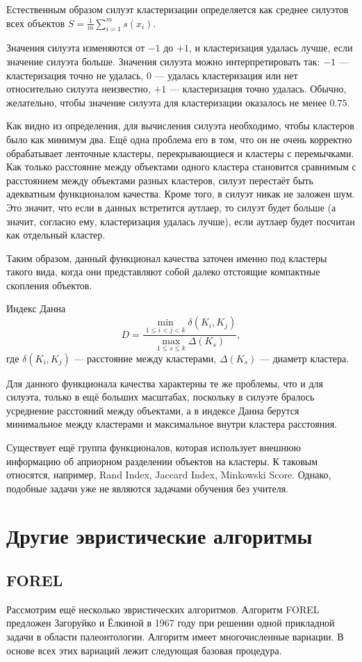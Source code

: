 \documentclass[10pt]{article}
\renewcommand{\leq}{\leqslant}
\begin{document}
Естественным образом силуэт кластеризации определяется как среднее силуэтов всех объектов $S = \frac{1}{m} \sum_{i=1}^m s(x_i)$.

Значения силуэта изменяются от $-1$ до $+1$, и кластеризация удалась лучше, если значение силуэта больше. Значения силуэта можно интерпретировать так: $-1$ --- кластеризация
точно не удалась, $0$ --- удалась кластеризация или нет относительно силуэта неизвестно, $+1$ --- кластеризация точно удалась. Обычно, желательно, чтобы значение силуэта
для кластеризации оказалось не менее $0.75$.

Как видно из определения, для вычисления силуэта необходимо, чтобы кластеров было как минимум два. Ещё одна проблема его в том, 
что он не очень корректно обрабатывает ленточные кластеры, перекрывающиеся и кластеры с перемычками. Как только расстояние между объектами одного кластера становится 
сравнимым с расстоянием между объектами разных кластеров, силуэт перестаёт быть адекватным функционалом качества.
Кроме того, в силуэт никак не заложен шум. Это значит, что если в данных встретится аутлаер, то силуэт будет больше (а значит, согласно ему, кластеризация удалась лучше), 
если аутлаер будет посчитан как отдельный кластер.

Таким образом, данный функционал качества заточен именно под кластеры такого вида, когда они представляют собой далеко отстоящие компактные скопления объектов.

Индекс Данна 
$$D = \frac{\min_{1 \leq i < j < k} \delta(K_i, K_j)}{\max_{1 \leq s \leq k} \Delta(K_s)},$$
	где $\delta(K_i, K_j)$ --- расстояние между кластерами, $\Delta(K_s)$ --- диаметр кластера.

Для данного функционала качества характерны те же проблемы, что и для силуэта, только в ещё больших масштабах, 
поскольку в силуэте бралось усреднение расстояний между объектами, а в индексе Данна берутся минимальное между кластерами и максимальное внутри кластера расстояния.

Существует ещё группа функционалов, которая использует внешнюю информацию об априорном разделении объектов на кластеры. 
К таковым относятся, например, Rand Index, Jaccard Index, Minkowski Score.
Однако, подобные задачи уже не являются задачами обучения без учителя.

\section{Другие эвристические алгоритмы}

\subsection{FOREL}
Рассмотрим ещё несколько эвристических алгоритмов. Алгоритм FOREL предложен Загоруйко и Ёлкиной в 1967 году
при решении одной прикладной задачи в области палеонтологии. Алгоритм имеет
многочисленные вариации. В основе всех этих вариаций лежит следующая базовая процедура.
\end{document}
